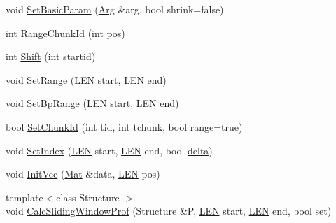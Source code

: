 \begin{DoxyCompactItemize}
\item 
void \hyperlink{class_rfold_1_1_paraso_r_ae6e89ca3ece9760c24461ff5509b6409}{Set\+Basic\+Param} (\hyperlink{class_rfold_1_1_arg}{Arg} \&arg, bool shrink=false)
\item 
int \hyperlink{class_rfold_1_1_paraso_r_ac14656436548df4306ef387bda5a0152}{Range\+Chunk\+Id} (int pos)
\item 
int \hyperlink{class_rfold_1_1_paraso_r_ac3515afcf36abba4a21548172138a784}{Shift} (int startid)
\item 
void \hyperlink{class_rfold_1_1_paraso_r_a84862289410d1791da040db720a4b4fa}{Set\+Range} (\hyperlink{energy__const_8hh_a05b49c662c073f89e86804f7856622a0}{L\+E\+N} start, \hyperlink{energy__const_8hh_a05b49c662c073f89e86804f7856622a0}{L\+E\+N} end)
\item 
void \hyperlink{class_rfold_1_1_paraso_r_a957949c0106b4f407f721c276495f36f}{Set\+Bp\+Range} (\hyperlink{energy__const_8hh_a05b49c662c073f89e86804f7856622a0}{L\+E\+N} start, \hyperlink{energy__const_8hh_a05b49c662c073f89e86804f7856622a0}{L\+E\+N} end)
\item 
bool \hyperlink{class_rfold_1_1_paraso_r_afffab65a875eb42915009928f9870fde}{Set\+Chunk\+Id} (int tid, int tchunk, bool range=true)
\item 
void \hyperlink{class_rfold_1_1_paraso_r_addc6e9ff9659c735a726cf78e2a5005e}{Set\+Index} (\hyperlink{energy__const_8hh_a05b49c662c073f89e86804f7856622a0}{L\+E\+N} start, \hyperlink{energy__const_8hh_a05b49c662c073f89e86804f7856622a0}{L\+E\+N} end, bool \hyperlink{class_rfold_1_1_paraso_r_ac0a808250ee05c1f56b5be32d867f11e}{delta})
\item 
void \hyperlink{class_rfold_1_1_paraso_r_a8d5e46c0bed60e2732c7c8417d4a8e56}{Init\+Vec} (\hyperlink{namespace_rfold_a6392dbfbc164230455fdcdb1a0ff53d7}{Mat} \&data, \hyperlink{energy__const_8hh_a05b49c662c073f89e86804f7856622a0}{L\+E\+N} pos)
\item 
{\footnotesize template$<$class Structure $>$ }\\void \hyperlink{class_rfold_1_1_paraso_r_a9ab821464d8b2d99e1923270b79a1851}{Calc\+Sliding\+Window\+Prof} (Structure \&P, \hyperlink{energy__const_8hh_a05b49c662c073f89e86804f7856622a0}{L\+E\+N} start, \hyperlink{energy__const_8hh_a05b49c662c073f89e86804f7856622a0}{L\+E\+N} end, bool set)
\end{DoxyCompactItemize}
